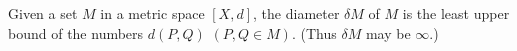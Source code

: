 Given a set $M$ in a metric space $[X, d]$, the diameter $\delta M$ of $M$ is the least upper bound of the numbers $d(P, Q)$ $(P, Q \in M)$. (Thus $\delta M$ may be $\infty$.)
